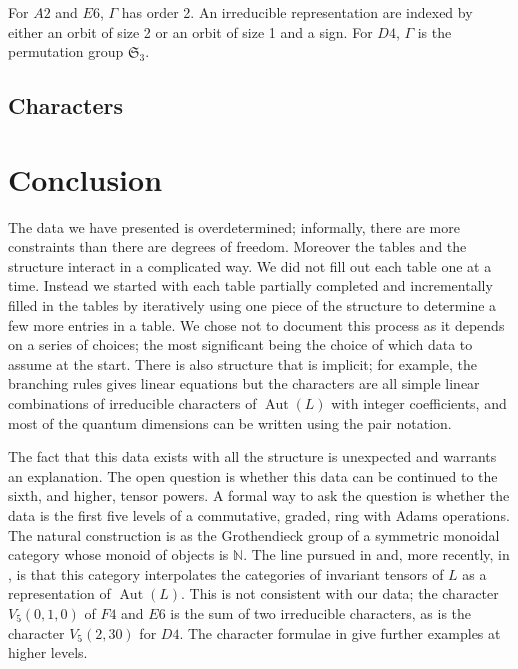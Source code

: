 \documentclass[12pt]{amsart}
\providecommand{\Aut}{\operatorname{Aut}}
\providecommand{\fS}{\mathfrak{S}}
\newcommand\bN{\mathbb{N}}
\begin{document}
For $A2$ and $E6$, $\Gamma$ has order 2. An irreducible representation are indexed by
either an orbit of size 2 or an orbit of size 1 and a sign.
For $D4$, $\Gamma$ is the permutation group $\fS_3$.

\subsection{Characters}







\section{Conclusion}
The data we have presented is overdetermined; informally, there are more constraints than there are degrees of freedom. Moreover the tables and the structure interact in a complicated way. We did not
fill out each table one at a time. Instead we started with each table partially completed and incrementally filled in the tables by iteratively using one piece of the structure to determine a few
more entries in a table. We chose not to document this process as it depends on a series of choices;
the most significant being the choice of which data to assume at the start. There is also structure
that is implicit; for example, the branching rules gives linear equations but the characters are all
simple linear combinations of irreducible characters of $\Aut(L)$ with integer coefficients,
and most of the quantum dimensions can be written using the pair notation.

The fact that this data exists with all the structure is unexpected and warrants an explanation.
The open question is whether this data can be continued to the sixth, and higher, tensor powers.
A formal way to ask the question is whether the data is the first five levels of a 
commutative, graded, ring with Adams operations. The natural construction is as the Grothendieck
group of a symmetric monoidal category whose monoid of objects is $\bN$. The line pursued in
\cite{Cohen1999} and, more recently, in \cite{morrison2024},\cite{westbury2024} is that this category interpolates
the categories of invariant tensors of $L$ as a representation of $\Aut(L)$. This is not 
consistent with our data; the character $V_5(0,1,0)$ of $F4$ and $E6$ is the sum of two irreducible characters, as is the character $V_5(2,30)$ for $D4$.
The character formulae in \cite{Westbury2006a} give further examples at higher levels.
\end{document}
